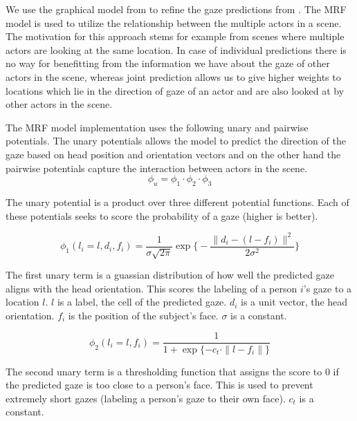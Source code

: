 \documentclass[10pt,twocolumn,letterpaper]{article}
\begin{document}
\vspace{3ex}
We use the graphical model from \cite{fathi2012social} to refine the gaze predictions from \cite{nips15_recasens}. The MRF model is used to utilize the relationship between the multiple actors in a scene. The motivation for this approach stems for example from scenes where multiple actors are looking at the same location. In case of individual predictions there is no way for benefitting from the information we have about the gaze of other actors in the scene, whereas joint prediction allows us to give higher weights to locations which lie in the direction of gaze of an actor and are also looked at by other actors in the scene.

The MRF model implementation uses the following unary and pairwise potentials. The unary potentials allows the model to predict the direction of the gaze based on head position and orientation vectors and on the other hand the pairwise potentials capture the interaction between actors in the scene. \\

\begin{equation}
  \phi_u = \phi_1 \cdot \phi_2 \cdot \phi_3
\end{equation}

The unary potential is a product over three different potential functions. Each of these potentials seeks to score the probability of a gaze (higher is better).

\begin{equation}
  \phi_1(l_i = l, d_i, f_i) = \frac{1}{\sigma \sqrt{2 \pi}} \exp{\big\{-\frac{\|d_i - (l - f_i)\|^2}{2 \sigma^2}\big\}}
\end{equation}

The first unary term is a guassian distribution of how well the predicted gaze aligns with the head orientation. This scores the labeling of a person $i$'s gaze to a location $l$. $l$ is a label, the cell of the predicted gaze. $d_i$ is a unit vector, the head orientation. $f_i$ is the position of the subject's face. $\sigma$ is a constant.

\begin{equation}
  \phi_2(l_i = l, f_i) = \frac{1}{1 + \exp{\{-c_t \cdot \|l - f_i\|\}}}
\end{equation}

The second unary term is a thresholding function that assigns the score to $0$ if the predicted gaze is too close to a person's face. This is used to prevent extremely short gazes (labeling a person's gaze to their own face). $c_t$ is a constant.
\end{document}
